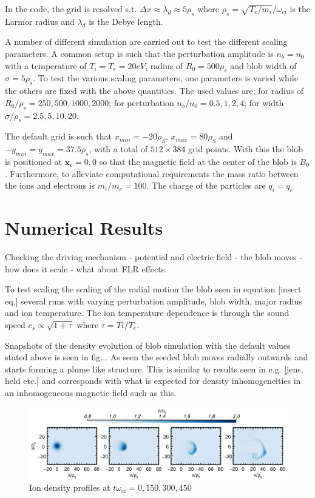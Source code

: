 \documentclass[9pt,twocolumn]{article}
\newcommand{\fd}[1]{\mathbf{#1}}
\renewcommand{\=}[1]{\stackrel{#1}{=}} %
\theoremstyle{definition}
\theoremstyle{remark}
\begin{document}
In the code, the grid is resolved s.t. $\Delta x\approx \lambda_d\approx 5\rho_s$ where $\rho_s=\sqrt{T_e/m_i}/\omega_{ci}$ is the Larmor radius and $\lambda_d$ is the Debye length.

A number of different simulation are carried out to test the different scaling parameters. A common setup is such that the perturbation amplitude is $n_b=n_0$ with a temperature of $T_i=T_e=20 eV$, radius of $R_0=500\rho_s$ and blob width of $\sigma = 5 \rho_s$. To test the various scaling parameters, one parameters is varied while the others are fixed with the above quantities. The used values are; for radius of $R_0/\rho_s = {250,500,1000,2000}$; for perturbation $n_b/n_0 = {0.5,1,2,4}$; for width $\sigma/\rho_s = {2.5,5,10,20}$.

The default grid is such that $x_{min}=-20\rho_S$, $x_{max}=80\rho_S$ and $-y_{min}=y_{max}=37.5\rho_s$, with a total of $512\times 384$ grid points. With this the blob is positioned at $\fd x_c = {0,0}$ so that the magnetic field at the center of the blob is $B_0$. Furthermore, to alleviate computational requirements the mass ratio between the ions and electrons is $m_i/m_e=100$. The charge of the particles are $q_i=q_e$
\section{Numerical Results}
Checking the driving mechanism - potential and electric field - the blob moves - how does it scale - what about FLR effects.

To test scaling the scaling of the radial motion the blob seen in equation [insert eq.] several runs with varying perturbation amplitude, blob width, major radius and ion temperature. The ion temperature dependence is through the sound speed $c_s\propto \sqrt{1+\tau}$ where $\tau = Ti/T_e$.

Snapshots of the density evolution of blob simulation with the default values stated above is seen in fig... As seen the seeded blob moves radially outwards and starts forming a plume like structure. This is similar to results seen in e.g. [jens, held etc.] and corresponds with what is expected for density inhomogeneities in an inhomogeneous magnetic field such as this. 

\begin{figure}[h]
  \includegraphics[trim=0mm 128mm 0mm 0mm,width=\textwidth]{Pictures/fourcontour.eps}
  \caption{Ion density profiles at $t\omega_{ci}={0,150,300,450}$}
  \label{blob}
\end{figure}
\end{document}
